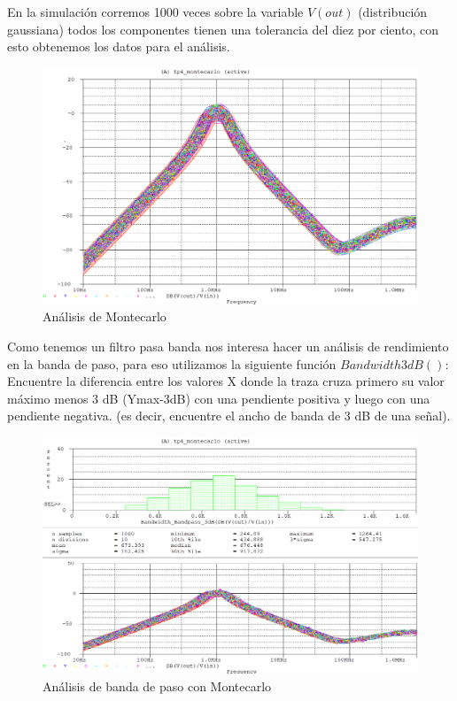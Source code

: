 \documentclass[12pt]{article}
\begin{document}
	En la simulación corremos 1000 veces sobre la variable $V(out)$ (distribución gaussiana) todos los componentes tienen una tolerancia del diez por ciento, con esto obtenemos los datos para el análisis.
	
	\begin{figure}
		\includegraphics[width=1\linewidth]{Simulaciones_Imagenes/monte_carlo_1}
		\caption[Análisis de Montecarlo]{Análisis de Montecarlo}
		\label{fig:montecarlo1}
	\end{figure}
	
	Como tenemos un filtro pasa banda nos interesa hacer un análisis de rendimiento en la banda de paso, para eso utilizamos la siguiente función $Bandwidth3dB()$: Encuentre la diferencia entre los valores X donde la traza cruza primero su valor máximo menos 3 dB (Ymax-3dB) con una pendiente positiva y luego con una pendiente negativa. (es decir, encuentre el ancho de banda de 3 dB de una señal).
	
	\begin{figure}[h!]
		\includegraphics[width=1\linewidth]{Simulaciones_Imagenes/banda_de_paso_montecarlo}
		\caption[Análisis de banda de paso con Montecarlo]{Análisis de banda de paso con Montecarlo}
		\label{fig:bandadepasomontecarlo}
	\end{figure}
	
\end{document}
